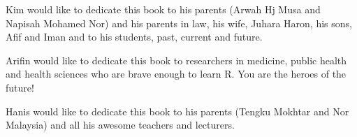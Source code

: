 
\thispagestyle{empty}

\begin{center}

Kim would like to dedicate this book to his parents (Arwah Hj Musa and Napisah Mohamed Nor) and his parents in law, his wife, Juhara Haron, his sons, Afif and Iman and to his students, past, current and future.

Arifin would like to dedicate this book to researchers in medicine, public health and health sciences who are brave enough to learn R. You are the heroes of the future!

Hanis would like to dedicate this book to his parents (Tengku Mokhtar and Nor Malaysia) and all his awesome teachers and lecturers.

\end{center}

\setlength{\abovedisplayskip}{-5pt}
\setlength{\abovedisplayshortskip}{-5pt}
